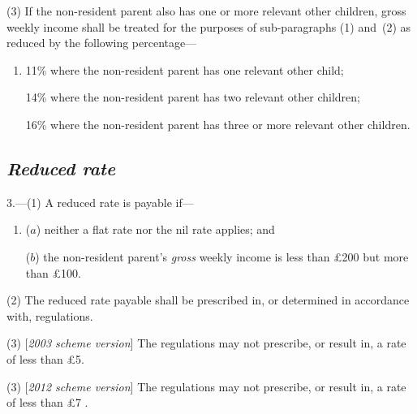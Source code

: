 \documentclass[12pt,a4paper]{article}
\begin{document}
(3) If the non-resident parent also has one or more relevant other children, gross weekly income shall be treated for the purposes of sub-paragraphs (1) and~(2) as reduced by the following percentage—
\begin{enumerate}\item[]
11\%  %
where the non-resident parent has one relevant other child;

14\%  %
where the non-resident parent has two relevant other children;

16\%  %
where the non-resident parent has three or more relevant other children.
\end{enumerate}


\subsection*{\itshape Reduced rate}

3.---(1) A reduced rate is payable if—
\begin{enumerate}\item[]
($a$) neither a flat rate nor the nil rate applies; and

($b$) the non-resident parent’s 
\emph{gross}  %
weekly income is less than £200 but more than £100. 
\end{enumerate}

(2) The reduced rate payable shall be prescribed in, or determined in accordance with, regulations.

(3) [\emph{2003 scheme version}] The regulations may not prescribe, or result in, a rate of less than £5. 

(3) [\emph{2012 scheme version}] The regulations may not prescribe, or result in, a rate of less than 
£7%
. 

\end{document}
